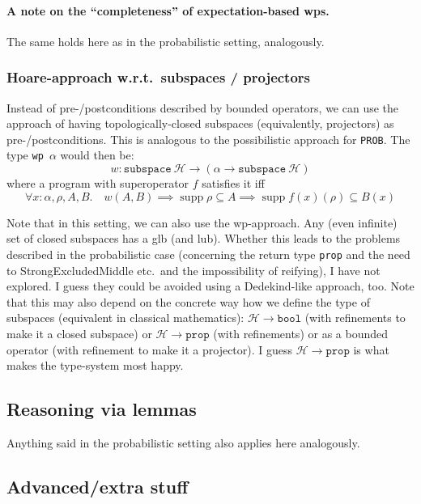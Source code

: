 \documentclass[a4paper]{article}
\newcommand\prop{\mathtt{prop}}
\newcommand\calH{\mathcal H}
\DeclareMathOperator\supp{supp}
\begin{document}
\paragraph{A note on the ``completeness'' of expectation-based wps.}
The same holds here as in the probabilistic setting, analogously.


\subsubsection{Hoare-approach w.r.t.~subspaces / projectors}

Instead of pre-/postconditions described by bounded operators, we can
use the approach of having topologically-closed subspaces
(equivalently, projectors) as pre-/postconditions.  This is analogous
to the possibilistic approach for \texttt{PROB}.  The type \texttt{wp
  $\alpha$} would then be:
\[
  w:\mathtt{subspace}\ \calH \to (\alpha\to\mathtt{subspace}\ \calH)
\]
where a program with superoperator $f$ satisfies it iff
\[
  \forall x:\alpha, \rho, A, B.\quad
  w(A,B) \implies
  \supp\rho \subseteq A \implies
  \supp f(x)(\rho) \subseteq B(x)
\]


Note that in this setting, we can also use the wp-approach. Any (even infinite) set of closed subspaces has a glb (and lub).
Whether this leads to the problems described in the probabilistic case (concerning the return type \texttt{prop} and the need to StrongExcludedMiddle etc.~and the impossibility of reifying), I have not explored. I guess they could be avoided using a Dedekind-like approach, too.
Note that this may also depend on the concrete way how we define the type of subspaces (equivalent in classical mathematics):
$\calH\to\mathtt{bool}$ (with refinements to make it a closed subspace) or $\calH\to\prop$ (with refinements) or as a bounded operator (with refinement to make it a projector).
I guess $\calH\to\prop$ is what makes the type-system most happy.




\subsection{Reasoning via lemmas}

Anything said in the probabilistic setting also applies here analogously.


\subsection{Advanced/extra stuff}
\end{document}
